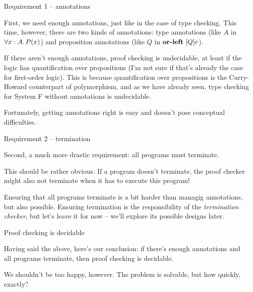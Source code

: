 \documentclass{beamer}
\begin{document}
\begin{frame}{Requirement 1 -- annotations}

First, we need enough annotations, just like in the case of type checking. This time, however, there are two kinds of annotations: type annotations (like $A$ in $\All{x}[A]{P(x)}$) and proposition annotations (like $Q$ in $\textbf{or-left}\ [Q]{e}$).

\vspace{1em}

If there aren't enough annotations, proof checking is undecidable, at least if the logic has quantification over propositions (I'm not sure if that's already the case for first-order logic). This is because quantification over propositions is the Curry-Howard counterpart of polymorphism, and as we have already seen, type checking for System F without annotations is undecidable.

\vspace{1em}

Fortunately, getting annotations right is easy and doesn't pose conceptual difficulties.

\end{frame}

\begin{frame}{Requirement 2 -- termination}

Second, a much more drastic requirement: all programs must terminate.

\vspace{2em}

This should be rather obvious. If a program doesn't terminate, the proof checker might also not terminate when it has to execute this program!

\vspace{2em}

Ensuring that all programs terminate is a bit harder than managig annotations, but also possible. Ensuring termination is the responsibility of the \textit{termination checker}, but let's leave it for now -- we'll explore its possible designs later.

\end{frame}

\begin{frame}{Proof checking is decidable}

Having said the above, here's our conclusion: if there's enough annotations and all programs terminate, then proof checking is decidable.

\vspace{2em}

We shouldn't be too happy, however. The problem is solvable, but how quickly, exactly?

\end{frame}
\end{document}
